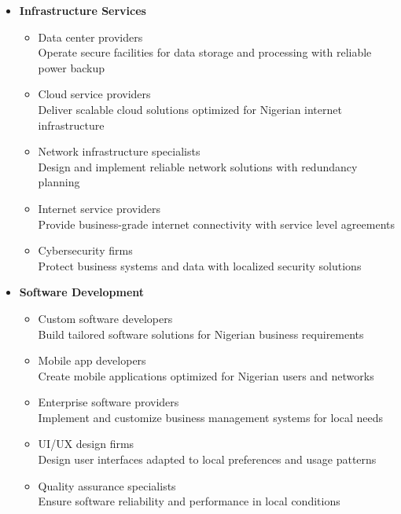 \begin{tcolorbox}[
    colback=white,
    colframe=primarydark,
    title=\textbf{Technology Service Providers},
    before skip=1em,
    after skip=1em
]
    \begin{itemize}[leftmargin=*,itemsep=0.5em]
        \item \textbf{Infrastructure Services}
        \begin{itemize}[itemsep=0.3em]
            \item Data center providers \\
                \small{Operate secure facilities for data storage and processing with reliable power backup}
            \item Cloud service providers \\
                \small{Deliver scalable cloud solutions optimized for Nigerian internet infrastructure}
            \item Network infrastructure specialists \\
                \small{Design and implement reliable network solutions with redundancy planning}
            \item Internet service providers \\
                \small{Provide business-grade internet connectivity with service level agreements}
            \item Cybersecurity firms \\
                \small{Protect business systems and data with localized security solutions}
        \end{itemize}

        \vspace{0.5em}

        \item \textbf{Software Development}
        \begin{itemize}[itemsep=0.3em]
            \item Custom software developers \\
                \small{Build tailored software solutions for Nigerian business requirements}
            \item Mobile app developers \\
                \small{Create mobile applications optimized for Nigerian users and networks}
            \item Enterprise software providers \\
                \small{Implement and customize business management systems for local needs}
            \item UI/UX design firms \\
                \small{Design user interfaces adapted to local preferences and usage patterns}
            \item Quality assurance specialists \\
                \small{Ensure software reliability and performance in local conditions}
        \end{itemize}


\end{itemize}
\end{tcolorbox}
